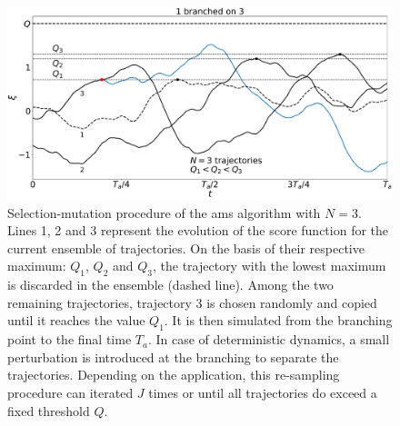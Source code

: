 \documentclass[pre,aps,floatfix,10pt,superscriptaddress, notitlepage,preprint]{revtex4-1}
\begin{document}
\begin{figure}
  \centering
  \includegraphics[width=\linewidth]{illustr_AMS/illustr_AMS}
  \caption{\label{fig:illustr_AMS} Selection-mutation procedure of the \ac{ams} algorithm with $N=3$. Lines 1, 2 and 3 represent the evolution of the score function for the current ensemble of trajectories. On the basis of their respective maximum: $Q_1$, $Q_2$ and $Q_3$, the trajectory with the lowest maximum is discarded in the ensemble (dashed line). Among the two remaining trajectories, trajectory 3 is chosen randomly and copied until it reaches the value $Q_1$. It is then simulated from the branching point to the final time $T_a$. In case of deterministic dynamics, a small perturbation is introduced at the branching to separate the trajectories. Depending on the application, this re-sampling procedure can iterated $J$ times or until all trajectories do exceed a fixed threshold $Q$.}
\end{figure}
\end{document}
